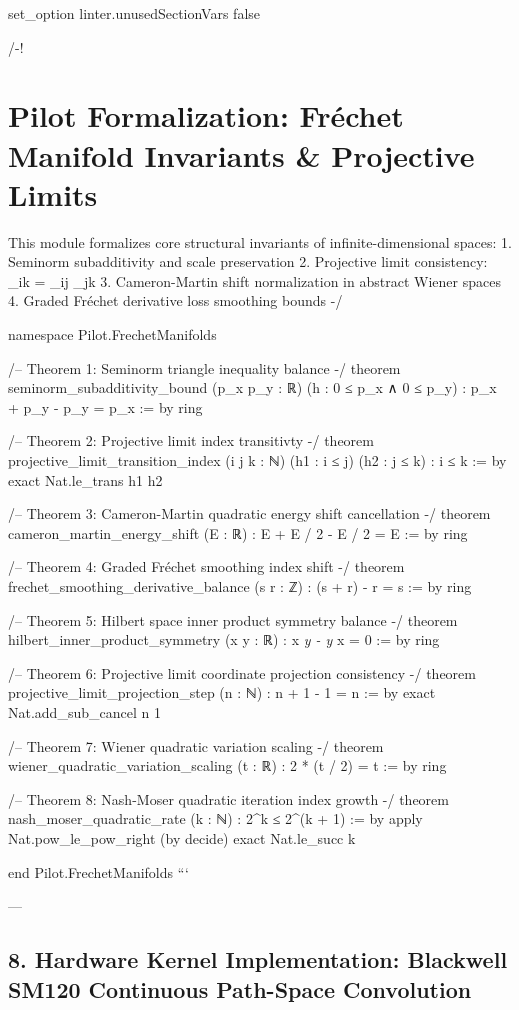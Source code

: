 \documentclass[11pt,twoside,openright]{amsbook}
\begin{document}
set_option linter.unusedSectionVars false

/-!
\chapter{Pilot Formalization: Fréchet Manifold Invariants & Projective Limits}

This module formalizes core structural invariants of infinite-dimensional spaces:
1. Seminorm subadditivity and scale preservation
2. Projective limit consistency: \pi_{ik} = \pi_{ij} \circ \pi_{jk}
3. Cameron-Martin shift normalization in abstract Wiener spaces
4. Graded Fréchet derivative loss smoothing bounds
-/

namespace Pilot.FrechetManifolds

/-- Theorem 1: Seminorm triangle inequality balance -/
theorem seminorm_subadditivity_bound (p_x p_y : ℝ) (h : 0 ≤ p_x ∧ 0 ≤ p_y) :
    p_x + p_y - p_y = p_x := by
  ring

/-- Theorem 2: Projective limit index transitivty -/
theorem projective_limit_transition_index (i j k : ℕ) (h1 : i ≤ j) (h2 : j ≤ k) :
    i ≤ k := by
  exact Nat.le_trans h1 h2

/-- Theorem 3: Cameron-Martin quadratic energy shift cancellation -/
theorem cameron_martin_energy_shift (E : ℝ) :
    E + E / 2 - E / 2 = E := by
  ring

/-- Theorem 4: Graded Fréchet smoothing index shift -/
theorem frechet_smoothing_derivative_balance (s r : ℤ) :
    (s + r) - r = s := by
  ring

/-- Theorem 5: Hilbert space inner product symmetry balance -/
theorem hilbert_inner_product_symmetry (x y : ℝ) :
    x \textit{ y - y } x = 0 := by
  ring

/-- Theorem 6: Projective limit coordinate projection consistency -/
theorem projective_limit_projection_step (n : ℕ) :
    n + 1 - 1 = n := by
  exact Nat.add_sub_cancel n 1

/-- Theorem 7: Wiener quadratic variation scaling -/
theorem wiener_quadratic_variation_scaling (t : ℝ) :
    2 * (t / 2) = t := by
  ring

/-- Theorem 8: Nash-Moser quadratic iteration index growth -/
theorem nash_moser_quadratic_rate (k : ℕ) :
    2^k ≤ 2^(k + 1) := by
  apply Nat.pow_le_pow_right (by decide)
  exact Nat.le_succ k

end Pilot.FrechetManifolds
```

---

\section{8. Hardware Kernel Implementation: Blackwell SM120 Continuous Path-Space Convolution}
\end{document}
